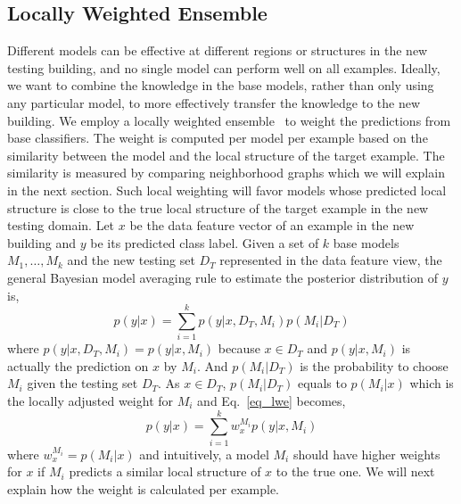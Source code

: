 \subsection{Locally Weighted Ensemble}
Different models can be effective at different regions or structures in the new testing building, and no single model can perform well on all examples. 
Ideally, we want to combine the knowledge in the base models, rather than only using any particular model, to more effectively transfer the knowledge to the new building. 
We employ a locally weighted ensemble~\cite{lwe} to weight the predictions from base classifiers. 
The weight is computed per model per example based on the similarity between the model and the local structure of the target example. 
The similarity is measured by comparing neighborhood graphs which we will explain in the next section. 
Such local weighting will favor models whose predicted local structure is close to the true local structure of the target example in the new testing domain. 
Let $x$ be the data feature vector of an example in the new building and $y$ be its predicted class label. Given a set of $k$ base models $M_1, \dots, M_k$ and the new testing set $D_T$ represented in the data feature view, the general Bayesian model averaging rule to estimate the posterior distribution of $y$ is,
\begin{equation}\label{eq_lwe}
p(y|x)=\sum_{i=1}^k p(y|x,D_T,M_i) p(M_i|D_T)
\end{equation}
where $p(y|x,D_T,M_i) = p(y|x,M_i)$ because $x \in D_T$ and $p(y|x,M_i)$ is actually the prediction on $x$ by $M_i$. And $p(M_i|D_T)$ is the probability to choose $M_i$ given the testing set $D_T$. As $x \in D_T$, $p(M_i|D_T)$ equals to $p(M_i|x)$ which is the locally adjusted weight for $M_i$ and Eq.~\ref{eq_lwe} becomes,
\begin{equation}\label{eq_sum}
p(y|x)=\sum_{i=1}^k w_{x}^{M_i} p(y|x, M_i)
\end{equation}
where $w_{x}^{M_i} = p(M_i|x)$ and intuitively, a model $M_i$ should have higher weights for $x$ if $M_i$ predicts a similar local structure of $x$ to the true one.
We will next explain how the weight is calculated per example.


